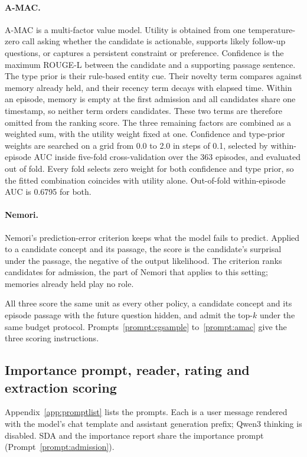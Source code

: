 \paragraph{A-MAC.}
A-MAC \citep{amac2026} is a multi-factor value model. Utility is obtained
from one temperature-zero call asking whether the candidate is
actionable, supports likely follow-up questions, or captures a
persistent constraint or preference. Confidence is the maximum ROUGE-L
between the candidate and a supporting passage sentence. The type prior
is their rule-based entity cue. Their novelty term compares against
memory already held, and their recency term decays with elapsed time.
Within an episode, memory is empty at the first admission and all
candidates share one timestamp, so neither term orders candidates.
These two terms are therefore omitted from the ranking score. The
three remaining factors are combined as a weighted sum, with the
utility weight fixed at one. Confidence and type-prior weights are
searched on a grid from 0.0 to 2.0 in steps of 0.1, selected by
within-episode AUC inside five-fold cross-validation over the 363
episodes, and evaluated out of fold. Every fold selects zero weight
for both confidence and type prior, so the fitted combination coincides
with utility alone. Out-of-fold within-episode AUC is 0.6795 for both.

\paragraph{Nemori.}
Nemori's prediction-error criterion \citep{nemori2026} keeps what the
model fails to predict. Applied to a candidate concept and its
passage, the score is the candidate's surprisal under the passage, the
negative of the output likelihood. The criterion ranks candidates for
admission, the part of Nemori that applies to this setting; memories
already held play no role.

All three score the same unit as every other policy, a candidate concept
and its episode passage with the future question hidden, and admit the
top-$k$ under the same budget protocol. Prompts~\ref{prompt:cgsample}
to~\ref{prompt:amac} give the three scoring instructions.

\subsection{Importance prompt, reader, rating and extraction scoring}
\label{app:prompts}

Appendix~\ref{app:promptlist} lists the prompts. Each is a user message
rendered with the model's chat template and assistant generation prefix;
Qwen3 thinking is disabled. SDA and the importance report share the
importance prompt (Prompt~\ref{prompt:admission}).

